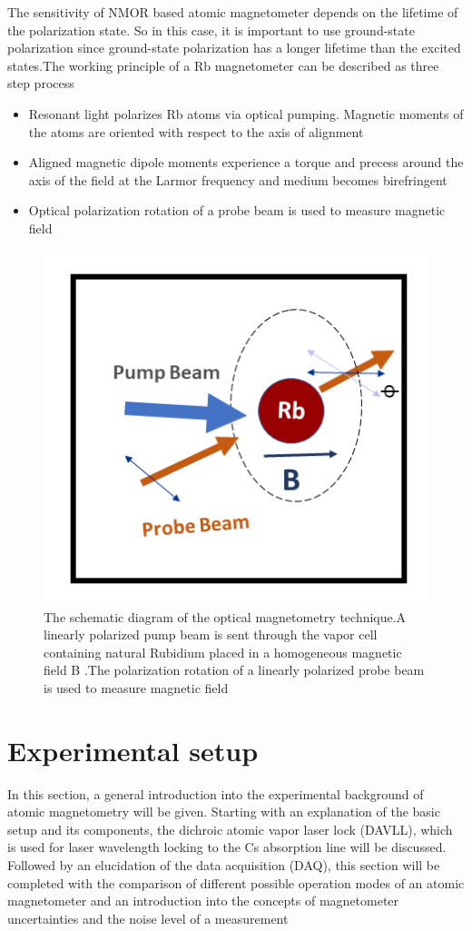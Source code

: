 \documentclass[12pt]{report}
\begin{document}
The sensitivity of NMOR based atomic magnetometer depends on the lifetime of the polarization state. So in this case, it is important to use ground-state polarization since ground-state polarization has a longer lifetime than the excited states.The working principle of a Rb magnetometer can be described as three step process
\begin{itemize}
\item
Resonant  light polarizes Rb atoms via optical pumping. Magnetic moments of the atoms are oriented with respect to the axis of alignment
\end{itemize}
\begin{itemize}
\item Aligned magnetic dipole moments experience a torque and precess around the axis of the field at the Larmor frequency and medium becomes birefringent
\end{itemize}
\begin{itemize}
\item Optical polarization rotation of a probe beam is used to measure magnetic field
\end{itemize}
\begin{figure}[h]
\centering
\includegraphics[width=0.55\linewidth]{figures/optical_pumping}
\caption{The schematic diagram of the optical magnetometry technique.A linearly polarized pump beam is sent through the vapor cell containing natural Rubidium placed in a homogeneous magnetic field B .The polarization rotation of a linearly polarized probe beam is used to measure magnetic field}
\end{figure}
\chapter{Experimental setup}
\small

In this section, a general introduction into the experimental background of atomic magnetometry will be given. Starting with an explanation of the basic setup and its components, the dichroic atomic vapor laser lock (DAVLL), which is used for laser wavelength locking to the Cs absorption line will be discussed. Followed by an elucidation of the data acquisition (DAQ), this section will be completed with the comparison of different possible operation modes of an atomic magnetometer and an introduction into the concepts of magnetometer uncertainties and the noise level of a measurement
\end{document}
